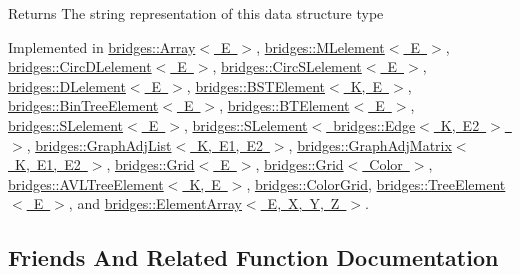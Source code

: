 \begin{DoxyReturn}{Returns}
The string representation of this data structure type 
\end{DoxyReturn}


Implemented in \mbox{\hyperlink{classbridges_1_1_array_ab93f7379870a7c0bc63490c53d95ba09}{bridges\+::\+Array$<$ E $>$}}, \mbox{\hyperlink{classbridges_1_1_m_lelement_af6e8a50c38e6481ce2c569d0174c564e}{bridges\+::\+M\+Lelement$<$ E $>$}}, \mbox{\hyperlink{classbridges_1_1_circ_d_lelement_a0e199fe681755df694807261ce2460c2}{bridges\+::\+Circ\+D\+Lelement$<$ E $>$}}, \mbox{\hyperlink{classbridges_1_1_circ_s_lelement_a4b27c205af46162371e3ffe05cbbe3d5}{bridges\+::\+Circ\+S\+Lelement$<$ E $>$}}, \mbox{\hyperlink{classbridges_1_1_d_lelement_a109be7aba8bd3d0450859938b5d3144c}{bridges\+::\+D\+Lelement$<$ E $>$}}, \mbox{\hyperlink{classbridges_1_1_b_s_t_element_af3843873c508c24f90b6e73a6f490bf8}{bridges\+::\+B\+S\+T\+Element$<$ K, E $>$}}, \mbox{\hyperlink{classbridges_1_1_bin_tree_element_a0a154f68ef0a58715e598a6ef92b9e59}{bridges\+::\+Bin\+Tree\+Element$<$ E $>$}}, \mbox{\hyperlink{classbridges_1_1_b_t_element_a43cc18d2c1e71c399782a306b60e4260}{bridges\+::\+B\+T\+Element$<$ E $>$}}, \mbox{\hyperlink{classbridges_1_1_s_lelement_a136330b3481a47b3edb429f323274655}{bridges\+::\+S\+Lelement$<$ E $>$}}, \mbox{\hyperlink{classbridges_1_1_s_lelement_a136330b3481a47b3edb429f323274655}{bridges\+::\+S\+Lelement$<$ bridges\+::\+Edge$<$ K, E2 $>$ $>$}}, \mbox{\hyperlink{classbridges_1_1_graph_adj_list_ab1aeeed39ac0e0f66a677e7b0e722030}{bridges\+::\+Graph\+Adj\+List$<$ K, E1, E2 $>$}}, \mbox{\hyperlink{classbridges_1_1_graph_adj_matrix_a9b379d65e61755be82bbed01885f1367}{bridges\+::\+Graph\+Adj\+Matrix$<$ K, E1, E2 $>$}}, \mbox{\hyperlink{classbridges_1_1_grid_ab701d081de4f7ffafb15966758dd5446}{bridges\+::\+Grid$<$ E $>$}}, \mbox{\hyperlink{classbridges_1_1_grid_ab701d081de4f7ffafb15966758dd5446}{bridges\+::\+Grid$<$ Color $>$}}, \mbox{\hyperlink{classbridges_1_1_a_v_l_tree_element_a24c005f8e07a7a2682225cead3b7e364}{bridges\+::\+A\+V\+L\+Tree\+Element$<$ K, E $>$}}, \mbox{\hyperlink{classbridges_1_1_color_grid_a6bb93994dade8e79a197459532dad153}{bridges\+::\+Color\+Grid}}, \mbox{\hyperlink{classbridges_1_1_tree_element_a6b264d7391442a742edf96bdd5ee5442}{bridges\+::\+Tree\+Element$<$ E $>$}}, and \mbox{\hyperlink{classbridges_1_1_element_array_adfb4e7d78ce01298ca66447e5c5abe6f}{bridges\+::\+Element\+Array$<$ E, X, Y, Z $>$}}.



\subsection{Friends And Related Function Documentation}
\mbox{\label{classbridges_1_1_data_structure_a0a9e3be9faab475909293766dcda4779}} 
